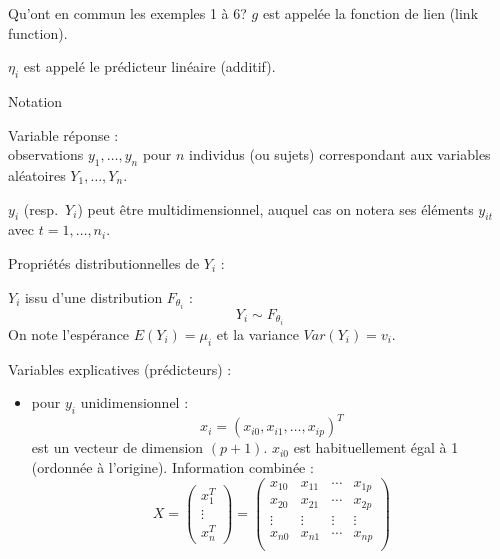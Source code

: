 \documentclass{BeamerTemplate}
\begin{document}
\begin{refsection}
\begin{frame}{Qu'ont en commun les exemples 1 à 6?}
$g$ est appelée la fonction de lien (link function).

\bigskip

$\eta_i$ est appelé le prédicteur linéaire (additif).

\end{frame}

\begin{frame}{Notation}

{\color{blue}Variable réponse} : \\
observations $y_1, \ldots, y_n$
pour $n$ individus (ou sujets) correspondant aux variables aléatoires $Y_1,
\ldots, Y_n$.

\bigskip

$y_i$ (resp.\ $Y_i$) peut être multidimensionnel, auquel cas
on notera ses éléments $y_{it}$ avec $t=1,\ldots,n_i$.

\bigskip

{\color{blue}Propriétés distributionnelles de $Y_i$} :

$Y_i$ issu d'une distribution $F_{\theta_i}$ :
$$Y_i \sim F_{\theta_i}$$
On note l'espérance $E(Y_i) = \mu_i$ et la variance $Var(Y_i) = v_i$.
\end{frame}

\begin{frame}{}

{\color{blue}Variables explicatives (prédicteurs)} :
\begin{itemize}
\item pour $y_i$ unidimensionnel :
$$x_i = (x_{i0}, x_{i1}, \ldots, x_{ip})^T$$
est un vecteur de dimension $(p+1)$. $x_{i0}$ est habituellement égal à 1
(ordonnée à l'origine). Information combinée :
$$X =  \left( \begin{array}{c}
x_1^T\\
\vdots \\
x_n^T
\end{array} \right) =
\left(
\begin{array}{cccc}
x_{10} & x_{11} & \cdots & x_{1p}\\
x_{20} & x_{21} & \cdots & x_{2p}\\
\vdots & \vdots & \vdots & \vdots \\
x_{n0} & x_{n1} & \cdots & x_{np}\\
\end{array} \right)
$$

\label{Ximatrix}
\end{itemize}
\end{frame}

\begin{frame}{}


\end{frame}
\end{refsection}
\end{document}
